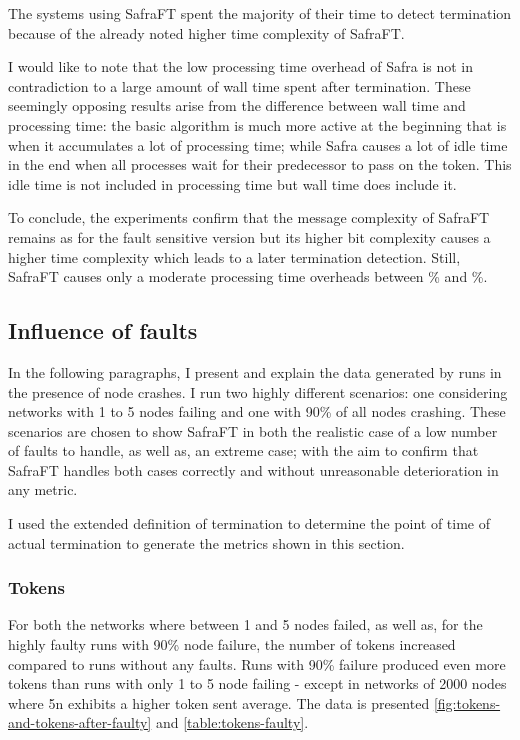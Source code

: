 The systems using SafraFT spent the majority of their time to detect termination because of the already noted higher time complexity of SafraFT.

I would like to note that the low processing time overhead of Safra is not in contradiction to a large amount of wall time spent after termination.
These seemingly opposing results arise from the difference between wall time and processing time: the basic algorithm is much more active at the beginning that is when it accumulates a lot of processing time; while Safra causes a lot of idle time in the end when all processes wait for their predecessor to pass on the token. 
This idle time is not included in processing time but wall time does include it.

To conclude, the experiments confirm that the message complexity of SafraFT remains as for the fault sensitive version but its higher bit complexity causes a higher time complexity which leads to a later termination detection. 
Still, SafraFT causes only a moderate processing time overheads between \% and \%.

\subsection{Influence of faults}
In the following paragraphs, I present and explain the data generated by runs in the presence of node crashes.
I run two highly different scenarios: one considering networks with 1 to 5 nodes failing and one with 90\% of all nodes crashing.
These scenarios are chosen to show SafraFT in both the realistic case of a low number of faults to handle, as well as, an extreme case; with the aim to confirm that SafraFT handles both cases correctly and without unreasonable deterioration in any metric.

I used the extended definition of termination to determine the point of time of actual termination to generate the metrics shown in this section.

\subsubsection{Tokens}
\label{ssec:tokens-faulty}
For both the networks where between 1 and 5 nodes failed, as well as, for the highly faulty runs with 90\% node failure, the number of tokens increased compared to runs without any faults.
Runs with 90\% failure produced even more tokens than runs with only 1 to 5 node failing - except in networks of 2000 nodes where 5n exhibits a higher token sent average.
The data is presented \cref{fig:tokens-and-tokens-after-faulty} and \cref{table:tokens-faulty}.

